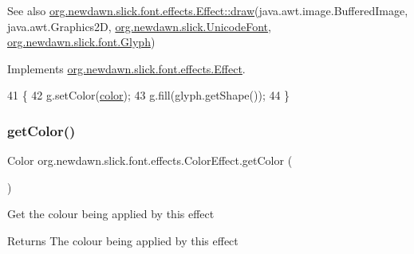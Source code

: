 \begin{DoxySeeAlso}{See also}
\mbox{\hyperlink{interfaceorg_1_1newdawn_1_1slick_1_1font_1_1effects_1_1_effect_a234db1cd6151bdbe9fda2099ee71eafb}{org.\+newdawn.\+slick.\+font.\+effects.\+Effect\+::draw}}(java.\+awt.\+image.\+Buffered\+Image, java.\+awt.\+Graphics2D, \mbox{\hyperlink{classorg_1_1newdawn_1_1slick_1_1_unicode_font}{org.\+newdawn.\+slick.\+Unicode\+Font}}, \mbox{\hyperlink{classorg_1_1newdawn_1_1slick_1_1font_1_1_glyph}{org.\+newdawn.\+slick.\+font.\+Glyph}}) 
\end{DoxySeeAlso}


Implements \mbox{\hyperlink{interfaceorg_1_1newdawn_1_1slick_1_1font_1_1effects_1_1_effect_a234db1cd6151bdbe9fda2099ee71eafb}{org.\+newdawn.\+slick.\+font.\+effects.\+Effect}}.


\begin{DoxyCode}
41                                                                                               \{
42         g.setColor(\mbox{\hyperlink{classorg_1_1newdawn_1_1slick_1_1font_1_1effects_1_1_color_effect_a2eb4f77d200293ea86166edce12f9817}{color}});
43         g.fill(glyph.getShape());
44     \}
\end{DoxyCode}
\mbox{\label{classorg_1_1newdawn_1_1slick_1_1font_1_1effects_1_1_color_effect_a2fff83c42b7a56f45731353057cd18fa}} 
\subsubsection{\texorpdfstring{get\+Color()}{getColor()}}
{\footnotesize\ttfamily Color org.\+newdawn.\+slick.\+font.\+effects.\+Color\+Effect.\+get\+Color (\begin{DoxyParamCaption}{ }\end{DoxyParamCaption})\hspace{0.3cm}{\ttfamily [inline]}}

Get the colour being applied by this effect

\begin{DoxyReturn}{Returns}
The colour being applied by this effect 
\end{DoxyReturn}

